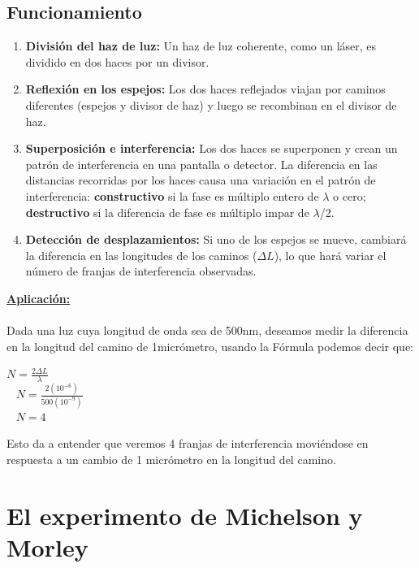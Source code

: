 \documentclass[a4paper]{article}
\begin{document}
		\subsection{Funcionamiento}
		\begin{enumerate}
			\item \textbf{División del haz de luz:} Un haz de luz coherente, como un láser, es dividido en dos haces por un divisor.
			
			\item \textbf{Reflexión en los espejos:} Los dos haces reflejados viajan por caminos diferentes (espejos y divisor de haz) y luego se recombinan en el divisor de haz.
			
			\item \textbf{Superposición e interferencia:} Los dos haces se superponen y crean un patrón de interferencia en una pantalla o detector. La diferencia en las distancias recorridas por los haces causa una variación en el patrón de interferencia: \textbf{constructivo} si la fase es múltiplo entero de $\lambda$ o cero; \textbf{destructivo} si la diferencia de fase es múltiplo impar de $\lambda$/2.
			
			\item \textbf{Detección de desplazamientos:} Si uno de los espejos se mueve, cambiará la diferencia en las longitudes de los caminos ($\Delta L$), lo que hará variar el número de franjas de interferencia observadas. 
		\end{enumerate}
		
		\textbf{\underline{Aplicación:}} \\ \\
		\indent Dada una luz cuya longitud de onda sea de 500nm, deseamos medir la diferencia en la longitud del camino de 1micrómetro, usando la Fórmula podemos decir que:
		\begin{center}
			$N = \frac{2 \Delta L}{\lambda}$  \\ \
			\newline
			$N = \frac{2(10^{-6})}{500(10^{-9})}$  \\ \
			\newline
			$N = 4$ \\
		\end{center}
		Esto da a entender que veremos 4 franjas de interferencia moviéndose en respuesta a un cambio de 1 micrómetro en la longitud del camino.
		
		\section{\textbf{El experimento de Michelson y Morley}}
		
\end{document}
